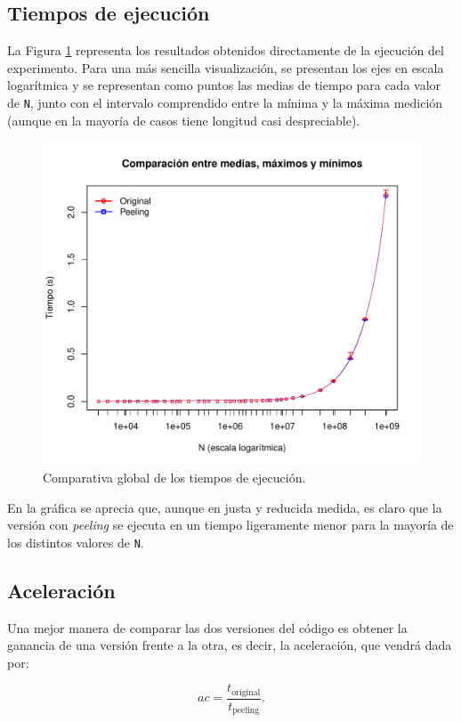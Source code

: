 \documentclass[11pt,a4paper,twoside]{article}
\theoremstyle{definition}
\begin{document}
	\subsection{Tiempos de ejecución}
	
	La Figura \ref{graf:tiempos} representa los resultados obtenidos directamente de la ejecución del experimento. Para una más sencilla visualización, se presentan los ejes en escala logarítmica y se representan como puntos las medias de tiempo para cada valor de \texttt{N}, junto con el intervalo comprendido entre la mínima y la máxima medición (aunque en la mayoría de casos tiene longitud casi despreciable).
	
	\begin{figure} [H] \centering
		\includegraphics[width=.8\textwidth]{../graficas/DIA_tiempos.pdf}
		\caption{Comparativa global de los tiempos de ejecución.}
		\label{graf:tiempos}
	\end{figure}
	
	En la gráfica se aprecia que, aunque en justa y reducida medida, es claro que la versión con \textit{peeling} se ejecuta en un tiempo ligeramente menor para la mayoría de los distintos valores de \texttt{N}.
	
	\subsection{Aceleración}
	
	Una mejor manera de comparar las dos versiones del código es obtener la ganancia de una versión frente a la otra, es decir, la aceleración, que vendrá dada por:
	
	\begin{equation} \label{eq:speedup}
		ac = \dfrac{t_{\text{original}}}{t_{\text{peeling}}}.
	\end{equation}
	
\end{document}
